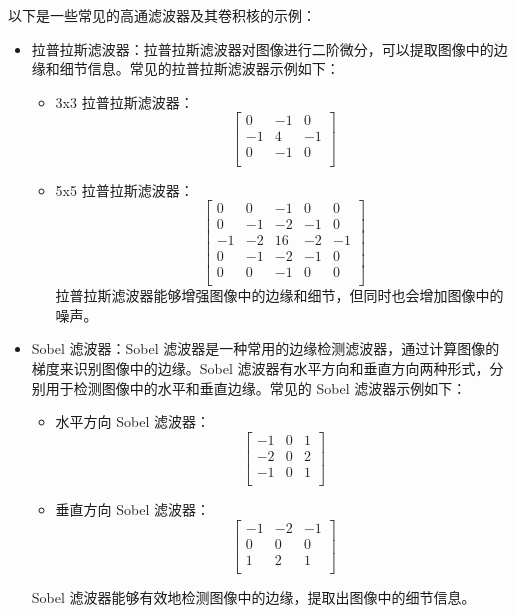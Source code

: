 \documentclass[a4paper,12pt]{article}
\begin{document}
以下是一些常见的高通滤波器及其卷积核的示例：

\begin{itemize}
    \item 拉普拉斯滤波器：拉普拉斯滤波器对图像进行二阶微分，可以提取图像中的边缘和细节信息。常见的拉普拉斯滤波器示例如下：
    
    \begin{itemize}
        \item 3x3 拉普拉斯滤波器：
        \[
        \begin{bmatrix}
        0 & -1 & 0 \\
        -1 & 4 & -1 \\
        0 & -1 & 0 \\
        \end{bmatrix}
        \]
        
        \item 5x5 拉普拉斯滤波器：
        \[
        \begin{bmatrix}
        0 & 0 & -1 & 0 & 0 \\
        0 & -1 & -2 & -1 & 0 \\
        -1 & -2 & 16 & -2 & -1 \\
        0 & -1 & -2 & -1 & 0 \\
        0 & 0 & -1 & 0 & 0 \\
        \end{bmatrix}
        \]
        拉普拉斯滤波器能够增强图像中的边缘和细节，但同时也会增加图像中的噪声。
    \end{itemize}

    \item Sobel 滤波器：Sobel 滤波器是一种常用的边缘检测滤波器，通过计算图像的梯度来识别图像中的边缘。Sobel 滤波器有水平方向和垂直方向两种形式，分别用于检测图像中的水平和垂直边缘。常见的 Sobel 滤波器示例如下：
    \begin{itemize}
        \item 水平方向 Sobel 滤波器：
        \[
        \begin{bmatrix}
        -1 & 0 & 1 \\
        -2 & 0 & 2 \\
        -1 & 0 & 1 \\
        \end{bmatrix}
        \]
        
        \item 垂直方向 Sobel 滤波器：
        \[
        \begin{bmatrix}
        -1 & -2 & -1 \\
        0 & 0 & 0 \\
        1 & 2 & 1 \\
        \end{bmatrix}
        \]
    \end{itemize}

    Sobel 滤波器能够有效地检测图像中的边缘，提取出图像中的细节信息。
\end{itemize}
\end{document}
